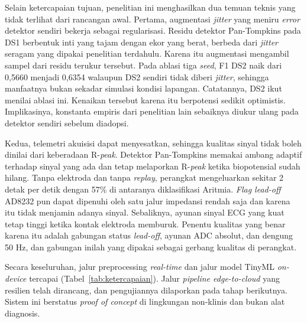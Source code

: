 Selain ketercapaian tujuan, penelitian ini menghasilkan dua temuan teknis yang tidak terlihat dari rancangan awal.
Pertama, augmentasi \textit{jitter} yang meniru \textit{error} detektor sendiri bekerja sebagai regularisasi. Residu detektor Pan-Tompkins pada DS1 berbentuk inti yang tajam dengan ekor yang berat, berbeda dari \textit{jitter} seragam yang dipakai penelitian terdahulu. Karena itu augmentasi mengambil sampel dari residu terukur tersebut. Pada ablasi tiga \textit{seed}, F1 DS2 naik dari 0,5660 menjadi 0,6354 walaupun DS2 sendiri tidak diberi \textit{jitter}, sehingga manfaatnya bukan sekadar simulasi kondisi lapangan. Catatannya, DS2 ikut menilai ablasi ini. Kenaikan tersebut karena itu berpotensi sedikit optimistis. Implikasinya, konstanta empiris dari penelitian lain sebaiknya diukur ulang pada detektor sendiri sebelum diadopsi.

Kedua, telemetri akuisisi dapat menyesatkan, sehingga kualitas sinyal tidak boleh dinilai dari keberadaan R-\textit{peak}. Detektor Pan-Tompkins memakai ambang adaptif terhadap sinyal yang ada dan tetap melaporkan R-\textit{peak} ketika biopotensial sudah hilang. Tanpa elektroda dan tanpa \textit{replay}, perangkat mengeluarkan sekitar 2 detak per detik dengan 57\% di antaranya diklasifikasi Aritmia. \textit{Flag lead-off} AD8232 pun dapat dipenuhi oleh satu jalur impedansi rendah saja dan karena itu tidak menjamin adanya sinyal. Sebaliknya, ayunan sinyal ECG yang kuat tetap tinggi ketika kontak elektroda memburuk. Penentu kualitas yang benar karena itu adalah gabungan status \textit{lead-off}, ayunan ADC absolut, dan dengung 50 Hz, dan gabungan inilah yang dipakai sebagai gerbang kualitas di perangkat.

Secara keseluruhan, jalur preprocessing \textit{real-time} dan jalur model TinyML \textit{on-device} tercapai (Tabel~\ref{tab:ketercapaian}). Jalur \textit{pipeline edge-to-cloud} yang resilien telah dirancang, dan pengujiannya dilaporkan pada tahap berikutnya. Sistem ini berstatus \textit{proof of concept} di lingkungan non-klinis dan bukan alat diagnosis.


